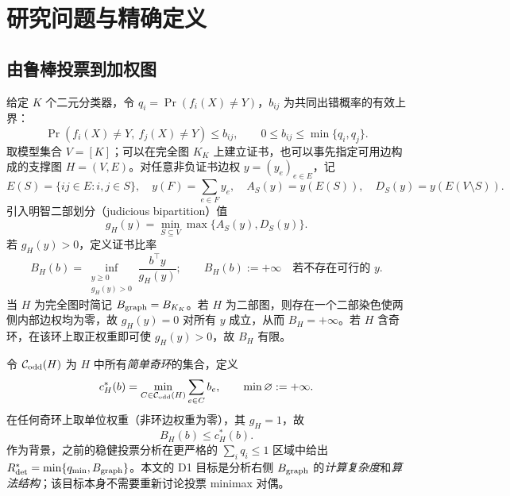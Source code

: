 \documentclass[11pt,a4paper]{ctexart}
\theoremstyle{definition}
\newcommand{\Odd}{\mathcal C_{\rm odd}}
\newcommand{\1}{\boldsymbol 1}
\begin{document}
\section{研究问题与精确定义}
\subsection{由鲁棒投票到加权图}
给定 $K$ 个二元分类器，令 $q_i=\Pr(f_i(X)\neq Y)$，$b_{ij}$ 为共同出错概率的有效上界：
\[
 \Pr(f_i(X)\neq Y,\ f_j(X)\neq Y)\le b_{ij},\qquad
 0\le b_{ij}\le\min\{q_i,q_j\}.
\]
取模型集合 $V=[K]$；可以在完全图 $K_K$ 上建立证书，也可以事先指定可用边构成的支撑图 $H=(V,E)$。对任意非负证书边权 $y=(y_e)_{e\in E}$，记
\[
 E(S)=\{ij\in E:i,j\in S\},\quad y(F)=\sum_{e\in F}y_e,\quad
 A_S(y)=y(E(S)),\quad D_S(y)=y(E(V\setminus S)).
\]
引入明智二部划分（judicious bipartition）值
\begin{equation}\label{eq:g}
 g_H(y)=\min_{S\subseteq V}\max\{A_S(y),D_S(y)\}.
\end{equation}
若 $g_H(y)>0$，定义证书比率
\begin{equation}\label{eq:Bdef}
 B_H(b)=\inf_{\substack{y\ge0\\g_H(y)>0}}\frac{b^\top y}{g_H(y)};
\qquad
 B_H(b):=+\infty\quad\text{若不存在可行的 }y.
\end{equation}
当 $H$ 为完全图时简记 $B_{\rm graph}=B_{K_K}$。若 $H$ 为二部图，则存在一个二部染色使两侧内部边权均为零，故 $g_H(y)=0$ 对所有 $y$ 成立，从而 $B_H=+\infty$。若 $H$ 含奇环，在该环上取正权重即可使 $g_H(y)>0$，故 $B_H$ 有限。

令 $\Odd(H)$ 为 $H$ 中所有\emph{简单奇环}的集合，定义
\begin{equation}\label{eq:cstar}
 c_H^*(b)=\min_{C\in\Odd(H)}\sum_{e\in C}b_e,
 \qquad \min\varnothing:=+\infty.
\end{equation}
在任何奇环上取单位权重（非环边权重为零），其 $g_H=1$，故
\begin{equation}\label{eq:cycleupper}
 B_H(b)\le c_H^*(b).
\end{equation}
作为背景，之前的稳健投票分析在更严格的 $\sum_iq_i\le1$ 区域中给出 $R_{\rm det}^*=\min\{q_{\min},B_{\rm graph}\}$。本文的 D1 目标是分析右侧 $B_{\rm graph}$ 的\emph{计算复杂度}和\emph{算法结构}；该目标本身不需要重新讨论投票 minimax 对偶。
\end{document}
